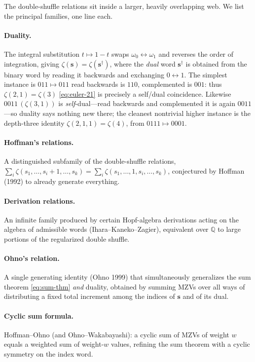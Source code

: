\documentclass[11pt]{article}
\theoremstyle{plain}
\theoremstyle{remark}
\begin{document}
The double-shuffle relations sit inside a larger, heavily overlapping web. We list the principal families, one line each.

\paragraph{Duality.} The integral substitution $t\mapsto1-t$ swaps $\omega_0\leftrightarrow\omega_1$ and reverses the order of integration, giving $\zeta(\mathbf{s})=\zeta(\mathbf{s}^\dagger)$, where the \emph{dual} word $\mathbf{s}^\dagger$ is obtained from the binary word by reading it backwards and exchanging $0\leftrightarrow1$. The simplest instance is $011\mapsto011$ read backwards is $110$, complemented is $001$: thus $\zeta(2,1)=\zeta(3)$ \eqref{eq:euler-21} is precisely a self/dual coincidence. Likewise $0011\,(\zeta(3,1))$ is \emph{self}-dual---read backwards and complemented it is again $0011$---so duality says nothing new there; the cleanest nontrivial higher instance is the depth-three identity $\zeta(2,1,1)=\zeta(4)$, from $0111\mapsto0001$.

\paragraph{Hoffman's relations.} A distinguished subfamily of the double-shuffle relations, $\sum_{i}\zeta(s_1,\dots,s_i+1,\dots,s_k)=\sum_{i}\zeta(s_1,\dots,1,s_i,\dots,s_k)$, conjectured by Hoffman (1992) to already generate everything.

\paragraph{Derivation relations.} An infinite family produced by certain Hopf-algebra derivations acting on the algebra of admissible words (Ihara--Kaneko--Zagier), equivalent over $\mathbb{Q}$ to large portions of the regularized double shuffle.

\paragraph{Ohno's relation.} A single generating identity (Ohno 1999) that simultaneously generalizes the sum theorem \eqref{eq:sum-thm} \emph{and} duality, obtained by summing MZVs over all ways of distributing a fixed total increment among the indices of $\mathbf{s}$ and of its dual.

\paragraph{Cyclic sum formula.} Hoffman--Ohno (and Ohno--Wakabayashi): a cyclic sum of MZVs of weight $w$ equals a weighted sum of weight-$w$ values, refining the sum theorem with a cyclic symmetry on the index word.
\end{document}
